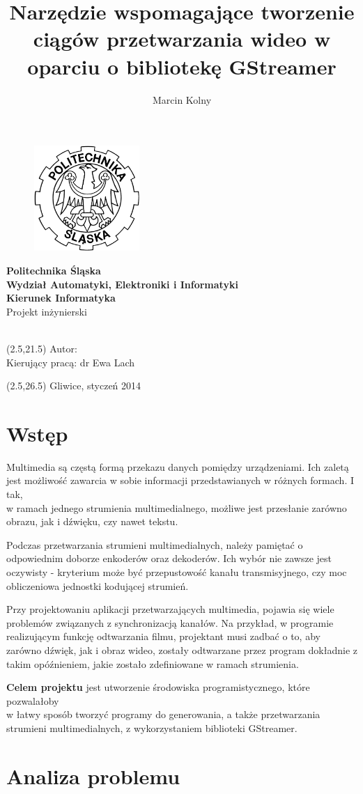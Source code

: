 \documentclass[12pt]{article}
\title{Narzędzie wspomagające tworzenie ciągów przetwarzania wideo w oparciu o bibliotekę GStreamer}
\author{Marcin Kolny}
\renewcommand{\maketitle}{
  \begin{titlepage}
    \begin{figure}  
      \includegraphics[width=40mm]{img/polsl-logo.png}
    \end{figure}
    \begin{center}
      \begingroup
      \fontsize{18pt}{21pt}\selectfont
      \textbf{Politechnika Śląska\\
        Wydział Automatyki, Elektroniki i Informatyki\\
        Kierunek Informatyka}\\
      \vspace{22mm}
      Projekt inżynierski\\
      \vspace{22mm}
      \endgroup
      \begingroup
      \fontsize{14pt}{17pt}\selectfont
      \thetitle \\
      \endgroup
      \vspace{30mm}
    \end{center}
    \begin{textblock}{14}(2.5,21.5)
      \fontsize{14pt}{17pt}\selectfont
      Autor: \theauthor \\
      Kierujący pracą: dr Ewa Lach\\
    \end{textblock}
    \begin{textblock}{20}(2.5,26.5)
      \fontsize{14pt}{17pt}\selectfont
      Gliwice, styczeń 2014\\
    \end{textblock}

  \end{titlepage}
}
\begin{document}
\maketitle
\tableofcontents
\cleardoublepage
\section{Wstęp}
Multimedia są częstą formą przekazu danych pomiędzy urządzeniami. Ich zaletą jest możliwość zawarcia w sobie informacji przedstawianych w różnych formach. I tak,\\w ramach jednego strumienia multimedialnego, możliwe jest przesłanie zarówno obrazu, jak i dźwięku, czy nawet tekstu. 

\noindent Podczas przetwarzania strumieni multimedialnych, należy pamiętać o odpowiednim doborze enkoderów oraz dekoderów. Ich wybór nie zawsze jest oczywisty - kryterium może być przepustowość kanału transmisyjnego, czy moc obliczeniowa jednostki kodującej strumień.

\noindent Przy projektowaniu aplikacji przetwarzających multimedia, pojawia się wiele problemów związanych z synchronizacją kanałów. Na przykład, w programie realizującym funkcję odtwarzania filmu, projektant musi zadbać o to, aby zarówno dźwięk, jak i obraz wideo, zostały odtwarzane przez program dokładnie z takim opóźnieniem, jakie zostało zdefiniowane w ramach strumienia. 

\noindent \textbf{Celem projektu} jest utworzenie środowiska programistycznego, które pozwalałoby \\w łatwy sposób tworzyć programy do generowania, a także przetwarzania strumieni multimedialnych, z wykorzystaniem biblioteki GStreamer.
\cleardoublepage
\section{Analiza problemu}
\end{document}
